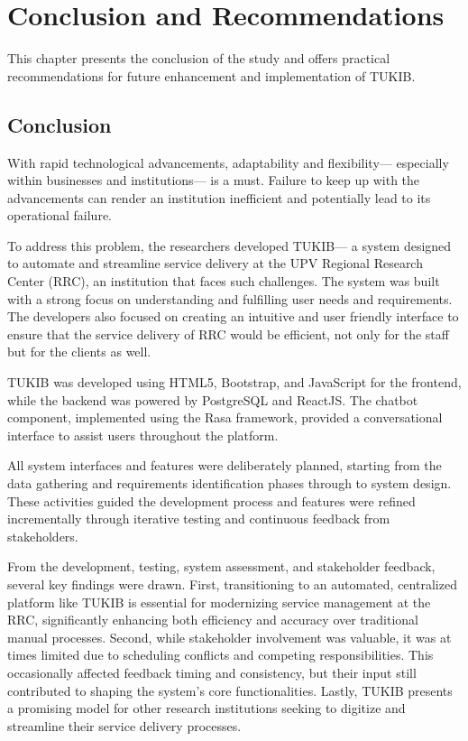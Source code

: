 \chapter{Conclusion and Recommendations}
This chapter presents the conclusion of the study and offers practical recommendations for future enhancement and implementation of TUKIB.

\section{Conclusion}

With rapid technological advancements, adaptability and flexibility— especially within businesses and institutions— is a must. Failure to keep up with the advancements can render an institution inefficient and potentially lead to its operational failure.

To address this problem, the researchers developed TUKIB— a system designed to automate and streamline service delivery at the UPV Regional Research Center (RRC), an institution that faces such challenges. The system was built with a strong focus on understanding and fulfilling user needs and requirements. The developers also focused on creating an intuitive and user friendly interface to ensure that the service delivery of RRC would be efficient, not only for the staff but for the clients as well. 

TUKIB was developed using HTML5, Bootstrap, and JavaScript for the frontend, while the backend was powered by PostgreSQL and ReactJS. The chatbot component, implemented using the Rasa framework, provided a conversational interface to assist users throughout the platform.

All system interfaces and features were deliberately planned, starting from the data gathering and requirements identification phases through to system design. These activities guided the development process and features were refined incrementally through iterative testing and continuous feedback from stakeholders.

From the development, testing, system assessment, and stakeholder feedback, several key findings were drawn. First, transitioning to an automated, centralized platform like TUKIB is essential for modernizing service management at the RRC, significantly enhancing both efficiency and accuracy over traditional manual processes. Second, while stakeholder involvement was valuable, it was at times limited due to scheduling conflicts and competing responsibilities. This occasionally affected feedback timing and consistency, but their input still contributed to shaping the system’s core functionalities. Lastly, TUKIB presents a promising model for other research institutions seeking to digitize and streamline their service delivery processes.

